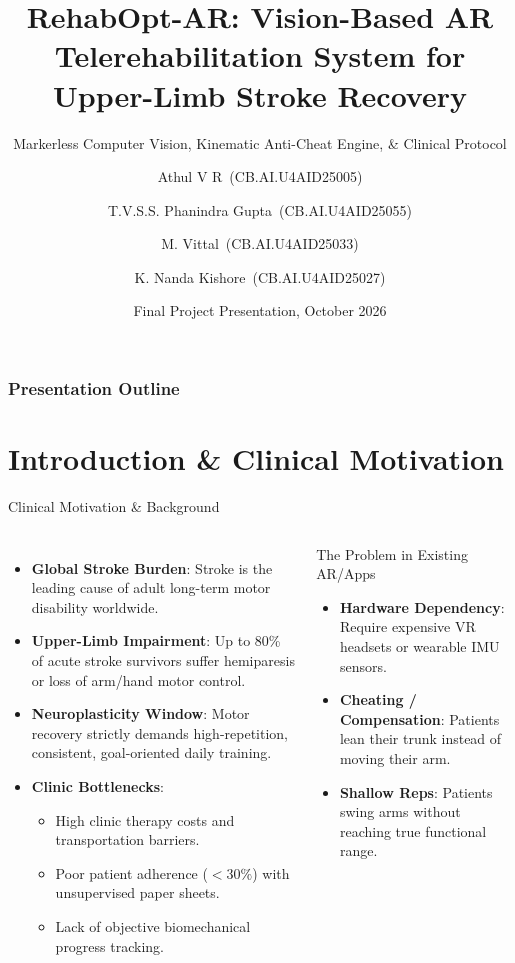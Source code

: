 \documentclass{beamer}
\title[RehabOpt-AR] %
{RehabOpt-AR: Vision-Based AR Telerehabilitation System for Upper-Limb Stroke Recovery}
\subtitle{Markerless Computer Vision, Kinematic Anti-Cheat Engine, \& Clinical Protocol}
\author[Group 12]
{Athul V R~(CB.AI.U4AID25005) \and
 T.V.S.S. Phanindra Gupta~(CB.AI.U4AID25055) \and
 M. Vittal~(CB.AI.U4AID25033) \and
 K. Nanda Kishore~(CB.AI.U4AID25027)}
\institute[Amrita Vishwa Vidyapeetham]
{
  Department of Artificial Intelligence\\
  Amrita School of Artificial Intelligence, Coimbatore\\
  Amrita Vishwa Vidyapeetham, India
}
\date[Project Review 2026]{Final Project Presentation, October 2026}
\begin{document}
\frame{\titlepage}

\begin{frame}
\frametitle{Presentation Outline}
\tableofcontents
\end{frame}

\section{Introduction \& Clinical Motivation}

\begin{frame}{Clinical Motivation \& Background}
\begin{columns}
\begin{itemize}
    \item \textbf{Global Stroke Burden}: Stroke is the leading cause of adult long-term motor disability worldwide.
    \item \textbf{Upper-Limb Impairment}: Up to 80\% of acute stroke survivors suffer hemiparesis or loss of arm/hand motor control.
    \item \textbf{Neuroplasticity Window}: Motor recovery strictly demands high-repetition, consistent, goal-oriented daily training.
    \item \textbf{Clinic Bottlenecks}:
    \begin{itemize}
        \item High clinic therapy costs and transportation barriers.
        \item Poor patient adherence ($<30\%$) with unsupervised paper sheets.
        \item Lack of objective biomechanical progress tracking.
    \end{itemize}
\end{itemize}

\begin{alertblock}{The Problem in Existing AR/Apps}
\begin{itemize}
    \item \textbf{Hardware Dependency}: Require expensive VR headsets or wearable IMU sensors.
    \item \textbf{Cheating / Compensation}: Patients lean their trunk instead of moving their arm.
    \item \textbf{Shallow Reps}: Patients swing arms without reaching true functional range.
\end{itemize}
\end{alertblock}
\end{columns}
\end{frame}
\end{document}
